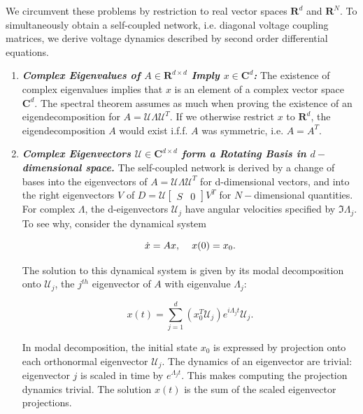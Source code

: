 We circumvent these problems by restriction to real vector spaces $\mathbf{R}^d$ and $\mathbf{R}^N$. To simultaneously obtain a self-coupled network, i.e. diagonal voltage coupling matrices, we derive voltage dynamics described by second order differential equations.






\begin{enumerate}

\item \textbf{\textit{Complex Eigenvalues of $A \in \mathbf{R}^{d \times d}$ Imply $x \in \mathbf{C}^d$: }} 
The existence of complex eigenvalues implies that $x$ is an element of a complex vector space $\mathbf{C}^d$. The spectral theorem assumes as much when proving the existence of an eigendecomposition for $A = \mathcal{U} \Lambda \mathcal{U}^T$. If we otherwise restrict $x$ to $\mathbf{R}^d$, the eigendecomposition $A$ would exist i.f.f. $A$ was symmetric, i.e. $A = A^T$. 



\item \textbf{\textit{Complex Eigenvectors $\mathcal{U} \in \mathbf{C}^{d \times d}$ form a Rotating Basis in $d-$dimensional space.}} The self-coupled network is derived by a change of bases into the eigenvectors of $A = \mathcal{U} \Lambda \mathcal{U}^T$ for d-dimensional vectors, and into the right eigenvectors $V$ of $D = \mathcal{U}\begin{bmatrix} S & 0 \end{bmatrix} V^T$ for $N-$dimensional quantities. For complex $\Lambda$, the d-eigenvectors $\mathcal{U}_j$ have angular velocities specified by $\Im \Lambda_j$. To see why, consider the dynamical system

$$
\dot{x} = Ax, \hspace{4mm} x(0) = x_0.
$$

The solution to this dynamical system is given by its modal decomposition onto $\mathcal{U}_j$, the $j^{th}$ eigenvector of $A$ with eigenvalue $\Lambda_j$:

$$
x(t) = \sum_{j=1}^{d} \left(x_0^T \mathcal{U}_j\right) e^{i \Lambda_j t} \mathcal{U}_j.
$$

In modal decomposition, the initial state $x_0$ is expressed by projection onto each orthonormal eigenvector $\mathcal{U}_j$. The dynamics of an eigenvector are trivial: eigenvector $j$ is scaled in time by $e^{\Lambda_j t}$. This makes computing the projection dynamics  trivial. The solution $x(t)$ is the sum of the scaled eigenvector projections. 



\end{enumerate}
